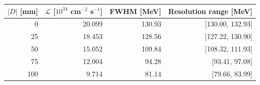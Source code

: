 \begin{tabular}{@{}rrrr@{}}
\toprule
$|D|$ [mm] & $\mathcal L$ [$10^{34}$ cm$^{-2}$ s$^{-1}$] & FWHM [MeV] & Resolution range [MeV]\\
\midrule
0 & 20.099 & 130.93 & [130.00, 132.93]\\
25 & 18.453 & 128.56 & [127.22, 130.90]\\
50 & 15.052 & 109.84 & [108.32, 111.93]\\
75 & 12.004 & 94.28 & [93.41, 97.08]\\
100 & 9.714 & 81.14 & [79.66, 83.99]\\
\bottomrule
\end{tabular}
